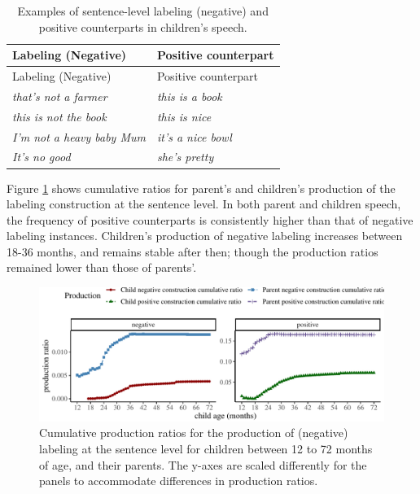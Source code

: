 \documentclass[
  man,floatsintext]{apa6}
\begin{document}
\begin{longtable}[]{@{}ll@{}}
\caption{\label{tab:label} Examples of sentence-level labeling (negative) and positive counterparts in children's speech.}\tabularnewline
\toprule\noalign{}
Labeling (Negative) & Positive counterpart \\
\midrule\noalign{}
\endfirsthead
\toprule\noalign{}
Labeling (Negative) & Positive counterpart \\
\midrule\noalign{}
\endhead
\bottomrule\noalign{}
\endlastfoot
\emph{that's not a farmer} & \emph{this is a book} \\
\emph{this is not the book} & \emph{this is nice} \\
\emph{I'm not a heavy baby Mum} & \emph{it's a nice bowl} \\
\emph{It's no good} & \emph{she's pretty} \\
\end{longtable}

Figure \ref{fig:learning} shows cumulative ratios for parent's and children's production of the labeling construction at the sentence level. In both parent and children speech, the frequency of positive counterparts is consistently higher than that of negative labeling instances. Children's production of negative labeling increases between 18-36 months, and remains stable after then; though the production ratios remained lower than those of parents'.

\begin{figure}[H]

{\centering \includegraphics{neg_construction_article_files/figure-latex/learning-1} 

}

\caption{Cumulative production ratios for the production of (negative) labeling at the sentence level for children between 12 to 72 months of age, and their parents. The y-axes are scaled differently for the panels to accommodate differences in production ratios.}\label{fig:learning}
\end{figure}
\end{document}
